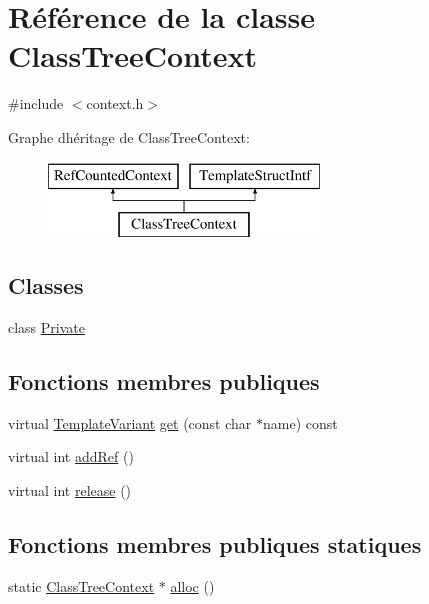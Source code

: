 \hypertarget{class_class_tree_context}{}\section{Référence de la classe Class\+Tree\+Context}
\label{class_class_tree_context}


{\ttfamily \#include $<$context.\+h$>$}

Graphe d\textquotesingle{}héritage de Class\+Tree\+Context\+:\begin{figure}[H]
\begin{center}
\leavevmode
\includegraphics[height=2.000000cm]{class_class_tree_context}
\end{center}
\end{figure}
\subsection*{Classes}
\begin{DoxyCompactItemize}
\item 
class \hyperlink{class_class_tree_context_1_1_private}{Private}
\end{DoxyCompactItemize}
\subsection*{Fonctions membres publiques}
\begin{DoxyCompactItemize}
\item 
virtual \hyperlink{class_template_variant}{Template\+Variant} \hyperlink{class_class_tree_context_aef08811ddccaa651400401bdd570ed7e}{get} (const char $\ast$name) const 
\item 
virtual int \hyperlink{class_class_tree_context_a309d28268edd019326c83f2d9480ba16}{add\+Ref} ()
\item 
virtual int \hyperlink{class_class_tree_context_a2a946d5d9d5170215eed8d69c5d51fc6}{release} ()
\end{DoxyCompactItemize}
\subsection*{Fonctions membres publiques statiques}
\begin{DoxyCompactItemize}
\item 
static \hyperlink{class_class_tree_context}{Class\+Tree\+Context} $\ast$ \hyperlink{class_class_tree_context_add688a0dc5bb8b4dc1e9ce700fe57459}{alloc} ()
\end{DoxyCompactItemize}


